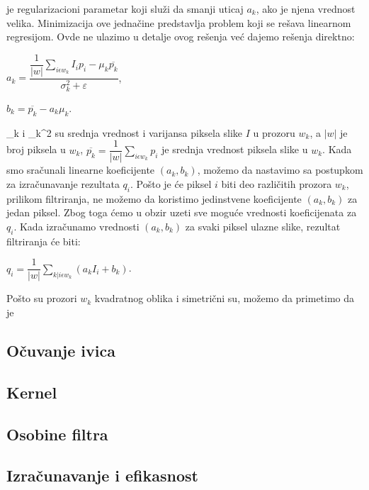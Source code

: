 \documentclass[a4paper,12pt,titlepage]{article}
\begin{document}
\varepsilon je regularizacioni parametar koji služi da smanji uticaj $a_k$, ako je njena vrednost velika. Minimizacija ove jednačine predstavlja problem koji se rešava linearnom regresijom. Ovde ne ulazimo u detalje ovog rešenja već dajemo rešenja direktno:

\begin{center}
	$a_k = \dfrac{\dfrac{1}{|w|} \sum_{i \epsilon w_k} I_ip_i - \mu_k \overline{p_k}}{\sigma_k^2 + \varepsilon}$,
\end{center}

\begin{center}
	$b_k = \overline{p_k} - a_k \mu_k$.
\end{center}

\mu_k i \sigma_k^2 su srednja vrednost i varijansa piksela slike $I$ u prozoru $w_k$, a $|w|$ je broj piksela u $w_k$, $\overline{p_k} = \dfrac{1}{|w|} \sum_{i \epsilon w_k} p_i$ je srednja vrednost piksela slike u $w_k$. Kada smo sračunali linearne koeficijente $(a_k, b_k)$, možemo da nastavimo sa postupkom za izračunavanje rezultata $q_i$. Pošto je će piksel $i$ biti deo različitih prozora $w_k$, prilikom filtriranja, ne možemo da koristimo jedinstvene koeficijente $(a_k, b_k)$ za jedan piksel. Zbog toga ćemo u obzir uzeti sve moguće vrednosti koeficijenata za $q_i$. Kada izračunamo vrednosti $(a_k, b_k)$ za svaki piksel ulazne slike, rezultat filtriranja će biti:

\begin{center}
	$q_i = \dfrac{1}{|w|} \sum_{k|i \epsilon w_k} (a_kI_i + b_k)$.
\end{center}    

Pošto su prozori $w_k$ kvadratnog oblika i simetrični su, možemo da primetimo da je 

\subsection{Očuvanje ivica}%

\subsection{Kernel}%

\subsection{Osobine filtra}%

\subsection{Izračunavanje i efikasnost}%
\end{document}
